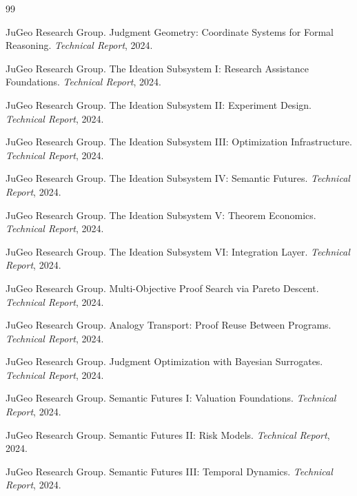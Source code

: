 \documentclass[11pt]{article}
\begin{document}
\begin{thebibliography}{99}

JuGeo Research Group.
\newblock Judgment Geometry: Coordinate Systems for Formal Reasoning.
\newblock \emph{Technical Report}, 2024.

JuGeo Research Group.
\newblock The Ideation Subsystem I: Research Assistance Foundations.
\newblock \emph{Technical Report}, 2024.

JuGeo Research Group.
\newblock The Ideation Subsystem II: Experiment Design.
\newblock \emph{Technical Report}, 2024.

JuGeo Research Group.
\newblock The Ideation Subsystem III: Optimization Infrastructure.
\newblock \emph{Technical Report}, 2024.

JuGeo Research Group.
\newblock The Ideation Subsystem IV: Semantic Futures.
\newblock \emph{Technical Report}, 2024.

JuGeo Research Group.
\newblock The Ideation Subsystem V: Theorem Economics.
\newblock \emph{Technical Report}, 2024.

JuGeo Research Group.
\newblock The Ideation Subsystem VI: Integration Layer.
\newblock \emph{Technical Report}, 2024.

JuGeo Research Group.
\newblock Multi-Objective Proof Search via Pareto Descent.
\newblock \emph{Technical Report}, 2024.

JuGeo Research Group.
\newblock Analogy Transport: Proof Reuse Between Programs.
\newblock \emph{Technical Report}, 2024.

JuGeo Research Group.
\newblock Judgment Optimization with Bayesian Surrogates.
\newblock \emph{Technical Report}, 2024.

JuGeo Research Group.
\newblock Semantic Futures I: Valuation Foundations.
\newblock \emph{Technical Report}, 2024.

JuGeo Research Group.
\newblock Semantic Futures II: Risk Models.
\newblock \emph{Technical Report}, 2024.

JuGeo Research Group.
\newblock Semantic Futures III: Temporal Dynamics.
\newblock \emph{Technical Report}, 2024.


\end{thebibliography}
\end{document}
